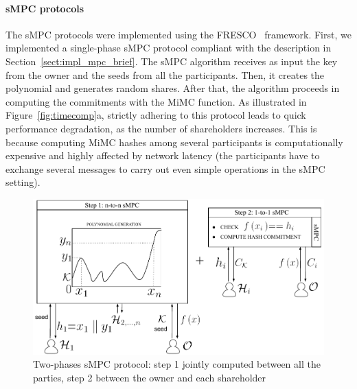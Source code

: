 \medskip

\paragraph*{sMPC protocols}

The sMPC protocols were implemented using the FRESCO~\cite{FRESCO-git,damgaard2016mpc} framework.
First, we implemented a single-phase sMPC protocol compliant with the description in Section~\ref{sect:impl_mpc_brief}.
The sMPC algorithm receives as input the key \key from the owner \owner and the seeds from all the participants. Then, it creates the polynomial and generates random shares. After that, the algorithm proceeds in computing the commitments with the MiMC function.
As illustrated in Figure~\ref{fig:timecomp}a, strictly adhering to this protocol leads to quick performance degradation, as the number of shareholders increases. This is because computing MiMC hashes among several participants is computationally expensive and highly affected by network latency (the participants have to exchange several messages to carry out even simple operations in the sMPC setting).

\begin{figure}[t]
	\centering
	\includegraphics[width=0.9\columnwidth]{fig/mpc_rev_2}
	
	\caption{Two-phases sMPC protocol: step 1 jointly computed between all the parties, step 2 between the owner and each shareholder}\vspace*{-2pt}
	\label{fig:mpc2}%
\end{figure}

